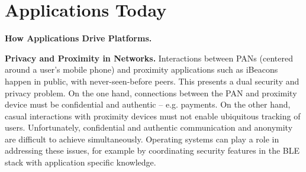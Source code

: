 \section{Applications Today}

\smallskip\noindent
\textbf{How Applications Drive Platforms.}

\glipsum[1-2]

\smallskip\noindent
\textbf{Privacy and Proximity in Networks.}
Interactions between PANs (centered around a user’s mobile phone)
and proximity applications such as iBeacons happen in public, with
never-seen-before peers. This presents a dual security and privacy problem. On
the one hand, connections between the PAN and proximity device must be
confidential and authentic -- e.g. payments.
On the other hand, casual interactions with
proximity devices must not enable ubiquitous tracking of users. Unfortunately,
confidential and authentic communication and anonymity are difficult to
achieve simultaneously.
%
Operating systems can play a role in addressing these issues, for example by coordinating
security features in the BLE stack with application specific knowledge.

%

